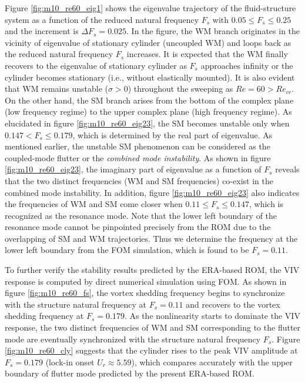 \documentclass{jfm}
\begin{document}
Figure \ref{fig:m10_re60_eig1} shows the eigenvalue trajectory of 
the fluid-structure system as a function of the reduced natural frequency 
$F_{s}$ with $0.05 \le F_{s} \le 0.25$ and
the increment is $\Delta F_{s}=0.025$.
%
In the figure, the WM branch originates in the vicinity of eigenvalue of stationary cylinder (uncoupled WM) 
and loops back as the reduced natural frequency $F_s$ increases. It is expected 
that the WM finally recovers to the eigenvalue of stationary cylinder as $F_s$ 
approaches infinity or the cylinder becomes stationary (i.e.,
without elastically mounted). It is also evident that WM  
remains unstable ($\sigma > 0$) throughout the sweeping as $Re = 60 > Re_{cr}$. 
On the other hand, the SM branch arises from the bottom of the complex plane (low frequency regime) to the upper complex plane (high frequency regime).
As elucidated in figure \ref{fig:m10_re60_eig23}, 
the SM becomes unstable only when $0.147 < F_{s} \le 0.179$, which is determined by
the real part of eigenvalue.
As mentioned earlier, the unstable SM phenomenon can be considered  
as the coupled-mode flutter or the \emph{combined mode instability}. 
As shown in figure \ref{fig:m10_re60_eig23}, the imaginary part of eigenvalue as a 
function of $F_s$ reveals that the two distinct frequencies (WM and SM frequencies) 
co-exist in the combined mode instability. 
In addition, figure \ref{fig:m10_re60_eig23} also indicates the frequencies 
of WM and SM come closer when $0.11 \le F_{s} \le 0.147$, which is recognized 
as the resonance mode. 
Note that the lower left boundary of the resonance mode 
cannot be pinpointed precisely from the ROM due to the overlapping of SM and WM trajectories. 
Thus we determine the frequency at the lower left boundary from the FOM simulation, 
which is found to be $F_s=0.11$.

To further verify the stability results predicted by the ERA-based ROM, 
the VIV response is computed by direct numerical simulation using FOM. 
%
As shown in figure \ref{fig:m10_re60_fs}, the vortex shedding frequency 
begins to synchronize with the structure natural frequency at $F_{s}=0.11$ and recovers to 
the vortex shedding frequency at $F_{s}=0.179$.
%
As the nonlinearity starts to dominate the VIV response, 
the two distinct frequencies of WM and SM corresponding to the flutter mode
are eventually synchronized with the structure natural frequency $F_s$. 
Figure \ref{fig:m10_re60_cly} suggests that the cylinder rises to the 
peak VIV amplitude at $F_{s}=0.179$ (lock-in onset $U_r \approx 5.59$), 
which compares accurately with the upper boundary of flutter mode predicted by the 
present ERA-based ROM.
\end{document}
